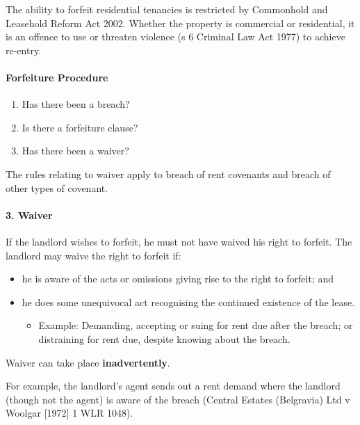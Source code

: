 \documentclass[
]{article}
\providecommand{\tightlist}{%
  \setlength{\itemsep}{0pt}\setlength{\parskip}{0pt}}
\begin{document}
The ability to forfeit residential tenancies is restricted by Commonhold
and Leasehold Reform Act 2002. Whether the property is commercial or
residential, it is an offence to use or threaten violence (s 6 Criminal
Law Act 1977) to achieve re-entry.

\hypertarget{forfeiture-procedure}{%
\paragraph{Forfeiture Procedure}\label{forfeiture-procedure}}

\begin{enumerate}
\tightlist
\item
  Has there been a breach?
\item
  Is there a forfeiture clause?
\item
  Has there been a waiver?
\end{enumerate}

The rules relating to waiver apply to breach of rent covenants and
breach of other types of covenant.

\hypertarget{waiver}{%
\paragraph{3. Waiver}\label{waiver}}

If the landlord wishes to forfeit, he must not have waived his right to
forfeit. The landlord may waive the right to forfeit if:

\begin{itemize}
\tightlist
\item
  he is aware of the acts or omissions giving rise to the right to
  forfeit; and
\item
  he does some unequivocal act recognising the continued existence of
  the lease.

  \begin{itemize}
  \tightlist
  \item
    Example: Demanding, accepting or suing for rent due after the
    breach; or distraining for rent due, despite knowing about the
    breach.
  \end{itemize}
\end{itemize}

Waiver can take place \textbf{inadvertently}.

For example, the landlord's agent sends out a rent demand where the
landlord (though not the agent) is aware of the breach (Central Estates
(Belgravia) Ltd v Woolgar {[}1972{]} 1 WLR 1048).
\end{document}
